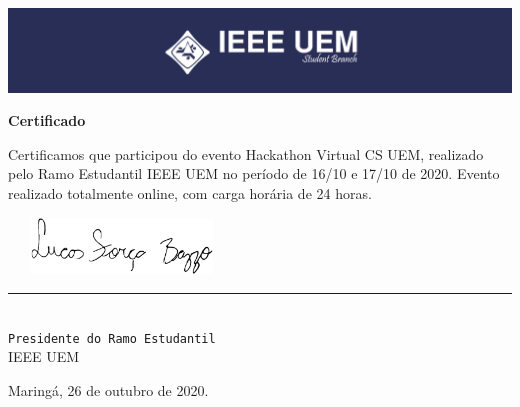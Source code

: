 \documentclass{article}
\begin{document}
	{
		\doublespacing
		\noindent
		\begin{minipage}{\textwidth}
			\includegraphics[width=\textwidth]{imagens/header.png}

			\sffamily
			\bigskip
			\bigskip

			\begin{center}
				{\Huge \textbf{Certificado}}\\
				\bigskip
				\bigskip
			\end{center}

			\begin{center}
				\begin{minipage}{0.8\textwidth}
    				{\Large Certificamos que \emph{\insertNOME} participou do evento Hackathon Virtual CS UEM, realizado pelo Ramo Estudantil IEEE UEM no período de 16/10 e 17/10 de 2020. Evento realizado totalmente online, com carga horária de 24 horas.}
				\end{minipage}
			\end{center}

			\vspace{2.5cm}
			\singlespacing 

			\begin{center}
			    \includegraphics[width=6cm, height=1.5cm]{imagens/Assinatura.png}
			    \vspace{-0.6cm}\\
				\Large {\rule{7.0cm}{0.5pt}\\
				\texttt{Presidente do Ramo Estudantil}\\
				IEEE UEM\\}
			\end{center}
			
			\vspace{2.5cm}
            
            \begin{minipage}{.9\textwidth}
                \begin{flushright}
    				{\Large Maringá, 26 de outubro de 2020.}
			    \end{flushright}
			\end{minipage}

		\end{minipage}
	}
\end{document}
